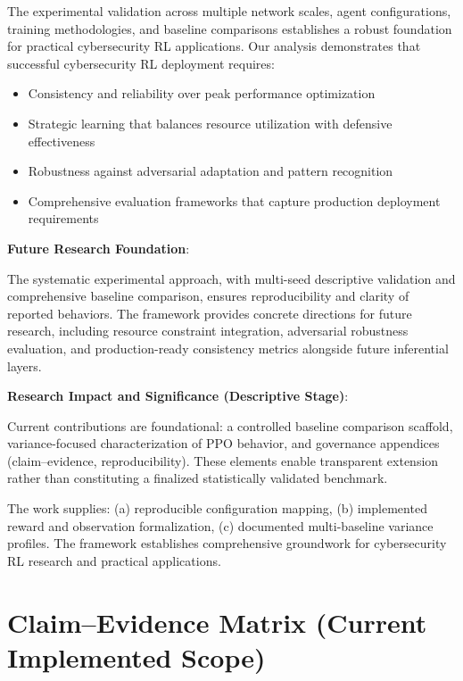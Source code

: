\documentclass[12pt,oneside]{article}
\begin{document}
The experimental validation across multiple network scales, agent configurations, training methodologies, and baseline comparisons establishes a robust foundation for practical cybersecurity RL applications. Our analysis demonstrates that successful cybersecurity RL deployment requires:
\begin{itemize}
\item Consistency and reliability over peak performance optimization
\item Strategic learning that balances resource utilization with defensive effectiveness
\item Robustness against adversarial adaptation and pattern recognition
\item Comprehensive evaluation frameworks that capture production deployment requirements
\end{itemize}

\textbf{Future Research Foundation}:

The systematic experimental approach, with multi-seed descriptive validation and comprehensive baseline comparison, ensures reproducibility and clarity of reported behaviors. The framework provides concrete directions for future research, including resource constraint integration, adversarial robustness evaluation, and production-ready consistency metrics alongside future inferential layers.

	\textbf{Research Impact and Significance (Descriptive Stage)}:

Current contributions are foundational: a controlled baseline comparison scaffold, variance-focused characterization of PPO behavior, and governance appendices (claim–evidence, reproducibility). These elements enable transparent extension rather than constituting a finalized statistically validated benchmark.

The work supplies: (a) reproducible configuration mapping, (b) implemented reward and observation formalization, (c) documented multi-baseline variance profiles. The framework establishes comprehensive groundwork for cybersecurity RL research and practical applications.


\appendix

\section{Claim--Evidence Matrix (Current Implemented Scope)}
\end{document}
